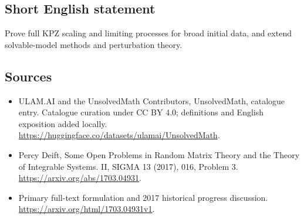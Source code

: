 \documentclass[11pt]{article}
\begin{document}
\subsection{Short English statement}
Prove full KPZ scaling and limiting processes for broad initial data, and extend solvable-model methods and perturbation theory.
\subsection{Sources}
\begin{itemize}
\item[\hypertarget{source:statement:1}{S1}] ULAM.AI and the UnsolvedMath Contributors, UnsolvedMath, catalogue entry. Catalogue curation under CC BY 4.0; definitions and English exposition added locally.
\url{https://huggingface.co/datasets/ulamai/UnsolvedMath}.
\item[\hypertarget{source:statement:2}{S2}] Percy Deift, Some Open Problems in Random Matrix Theory and the Theory of Integrable Systems. II, SIGMA 13 (2017), 016, Problem 3.
\url{https://arxiv.org/abs/1703.04931}.
\item[\hypertarget{source:statement:3}{S3}] Primary full-text formulation and 2017 historical progress discussion.
\url{https://arxiv.org/html/1703.04931v1}.
\end{itemize}
\label{end:statement}
\end{document}
